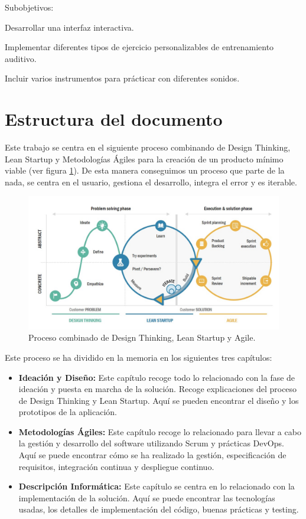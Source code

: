 \documentclass[12pt,twoside,titlepage]{report}
\begin{document}
Subobjetivos:
\begin{compactitem}
    \item Desarrollar una interfaz interactiva.
    \item Implementar diferentes tipos de ejercicio personalizables de entrenamiento auditivo. 
    \item Incluir varios instrumentos para prácticar con diferentes sonidos.
\end{compactitem}

\section{Estructura del documento}

Este trabajo se centra en el siguiente proceso combinando de Design Thinking, Lean Startup y Metodologías Ágiles para la creación de un producto mínimo viable (ver figura \ref{fig:LeanDesignAgile}). De esta manera conseguimos un proceso que parte de la nada, se centra en el usuario, gestiona el desarrollo, integra el error y es iterable.

\begin{figure}[H] 
    \includegraphics[scale=0.45]{LeanDesignAgile}
    \centering
    \caption{Proceso combinado de Design Thinking, Lean Startup y Agile.}
    \label{fig:LeanDesignAgile}
\end{figure}

Este proceso se ha dividido en la memoria en los siguientes tres capítulos:

\begin{itemize}
    \item \textbf{Ideación y Diseño:} Este capítulo recoge todo lo relacionado con la fase de ideación y puesta en marcha de la solución. Recoge explicaciones del proceso de Design Thinking y Lean Startup. Aquí se pueden encontrar el diseño y los prototipos de la aplicación.
    \item \textbf{Metodologías Ágiles:} Este capítulo recoge lo relacionado para llevar a cabo la gestión y desarrollo del software utilizando Scrum y prácticas DevOps. Aquí se puede encontrar cómo se ha realizado la gestión, especificación de requisitos, integración continua y despliegue continuo.
    \item \textbf{Descripción Informática:} Este capítulo se centra en lo relacionado con la implementación de la solución. Aquí se puede encontrar las tecnologías usadas, los detalles de implementación del código, buenas prácticas y testing.
\end{itemize}
\end{document}
